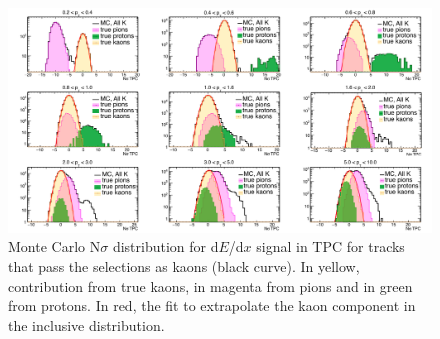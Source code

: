\begin{figure}[!h]
 \centering
 \includegraphics[angle=0, width=15cm]{./FigCap5/KaonTPCFromTOF_MC.png}
 \caption{Monte Carlo N$\sigma$ distribution for d$E$/d$x$ signal in TPC for tracks that pass the selections as kaons (black curve). In yellow, contribution from true kaons, in magenta from pions and in green from protons. In red, the fit to extrapolate the kaon component in the inclusive distribution.}
 \label{fig:MCKaonsTPC} 
\end{figure}

